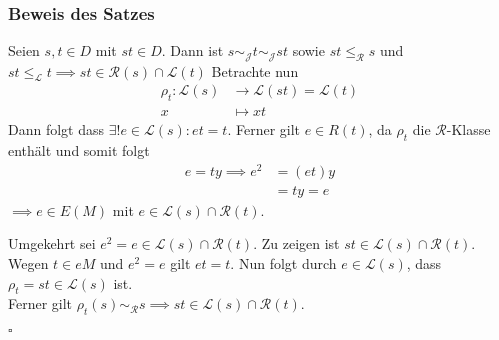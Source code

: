 \documentclass[12pt, german]{article}
\newcommand{\grer}{\sim_{\mathcal{R}}}
\newcommand{\grej}{\sim_{\mathcal{J}}}
\newcommand{\lgreleq}{\leqslant_{\mathcal{L}}}
\newcommand{\lgrereq}{\leqslant_{\mathcal{R}}}
\newcommand{\lcal}{\mathcal L}
\newcommand{\rcal}{\mathcal R}
\newcommand{\bewiesen}{
	
	\begin{flushright}
		$\square$  \\
\end{flushright}}
\begin{document}
	\subsubsection{Beweis des Satzes}
	Seien $s,t \in D$ mit $st \in D$. Dann ist $s \grej t \grej st$ sowie $st \lgrereq s$ und $st \lgreleq t \implies st \in \rcal(s) \cap \lcal(t)$
	Betrachte nun 
	\begin{align*}
		\rho_t : \lcal(s) &\to \lcal(st) = \lcal(t) \\
		x &\mapsto xt
	\end{align*}
	Dann folgt dass $\exists! e \in \lcal(s): et = t$. Ferner gilt $e \in R(t)$, da $\rho_t$ die $\rcal$-Klasse  enthält und somit folgt 
	\begin{align*}
		e = ty \implies e^2 &= (et)y \\
		&=ty = e
	\end{align*}
	$\implies e \in E(M)$ mit $e \in \lcal(s) \cap \rcal(t)$. 
	\newline
	
	Umgekehrt sei $e^2 = e \in \lcal(s) \cap \rcal(t)$. Zu zeigen ist $st \in \lcal(s) \cap \rcal(t)$. \\
	Wegen $ t \in eM$ und $e^2 = e$ gilt $et =t$.
	Nun folgt durch $e \in \lcal(s)$, dass $\rho_t = st \in \lcal(s)$ ist. \\ 
	Ferner gilt $\rho_t(s) \grer s \implies st \in \lcal(s) \cap \rcal(t)$.
	\bewiesen
	
	
\end{document}
